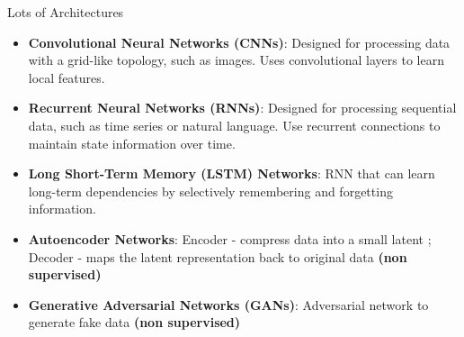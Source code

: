 \documentclass{beamer}
\begin{document}
\begin{frame}{Lots of Architectures}
\begin{itemize}    
    \item \textbf{Convolutional Neural Networks (CNNs)}: Designed for processing data with a grid-like topology, such as images. Uses convolutional layers to learn local features. 
    
    \item \textbf{Recurrent Neural Networks (RNNs)}: Designed for processing sequential data, such as time series or natural language. Use recurrent connections to maintain state information over time.
    
    \item \textbf{Long Short-Term Memory (LSTM) Networks}: RNN that can learn long-term dependencies by selectively remembering and forgetting information.
    
    \item \textbf{Autoencoder Networks}: Encoder - compress data into a small latent ; Decoder - maps the latent representation back to original data \textbf{(non supervised)}
    
    \item \textbf{Generative Adversarial Networks (GANs)}: Adversarial network to generate fake data \textbf{(non supervised)}
    
\end{itemize}
\end{frame}

\begin{frame}{}
    
\end{frame}
\end{document}
